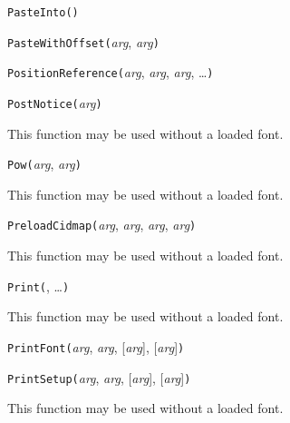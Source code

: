 
\texttt{PasteInto(}\texttt{)}



\texttt{PasteWithOffset(}\textit{arg}, \textit{arg}\texttt{)}



\texttt{PositionReference(}\textit{arg}, \textit{arg}, \textit{arg}, \ldots\texttt{)}



\texttt{PostNotice(}\textit{arg}\texttt{)}

This function may be used without a loaded font.



\texttt{Pow(}\textit{arg}, \textit{arg}\texttt{)}

This function may be used without a loaded font.



\texttt{PreloadCidmap(}\textit{arg}, \textit{arg}, \textit{arg}, \textit{arg}\texttt{)}

This function may be used without a loaded font.



\texttt{Print(}, \ldots\texttt{)}

This function may be used without a loaded font.



\texttt{PrintFont(}\textit{arg}, \textit{arg}, [\textit{arg}], [\textit{arg}]\texttt{)}



\texttt{PrintSetup(}\textit{arg}, \textit{arg}, [\textit{arg}], [\textit{arg}]\texttt{)}

This function may be used without a loaded font.


